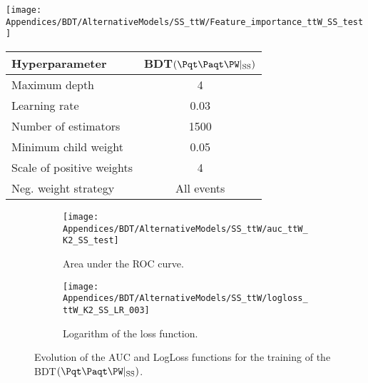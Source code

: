    \begin{minipage}{0.55\textwidth}
        \centering
        \texttt{[image: Appendices/BDT/AlternativeModels/SS\_ttW/Feature\_importance\_ttW\_SS\_test]}
        \label{fig:BDT:AltModels:ttWSS:Vars}
    \end{minipage}
    \hfill
    \begin{minipage}{0.4\textwidth}
	\centering
	\begin{adjustbox}{max width=0.99\textwidth}
		\begin{tabular}{l|c}
		\toprule
		Hyperparameter            	& BDT$(\ttW|_{\text{SS}})$ \\ \midrule
		Maximum depth             	& 4                        \\
		Learning rate             	& 0.03                   \\
		Number of estimators      	& 1500                     \\
		Minimum child weight       	& 0.05                     \\
		Scale of positive weights 	& 4                  \\
		Neg. weight strategy      	& All events           \\ \bottomrule
		\end{tabular}
	\end{adjustbox}
	\label{tab:BDT:AltModels:ttWSS:hyper}
    \end{minipage}

\begin{figure}[h]
\centering
\begin{subfigure}{.475\textwidth}
  \centering
  \texttt{[image: Appendices/BDT/AlternativeModels/SS\_ttW/auc\_ttW\_K2\_SS\_test]}
  \caption{Area under the ROC curve.}
  \label{fig:BDT:AltModels:ttWSS:AUC}
\end{subfigure}%
\begin{subfigure}{.475\textwidth}
  \centering
  \texttt{[image: Appendices/BDT/AlternativeModels/SS\_ttW/logloss\_ttW\_K2\_SS\_LR\_003]}
  \caption{Logarithm of the loss function.}
  \label{fig:BDT:AltModels:ttWSS:LogLoss}
\end{subfigure}
\caption{Evolution of the AUC and LogLoss functions for the training of the BDT$(\ttW|_{\text{SS}})$.}
\label{fig:BDT:AltModels:Epochs:ttWSS}
\end{figure}

